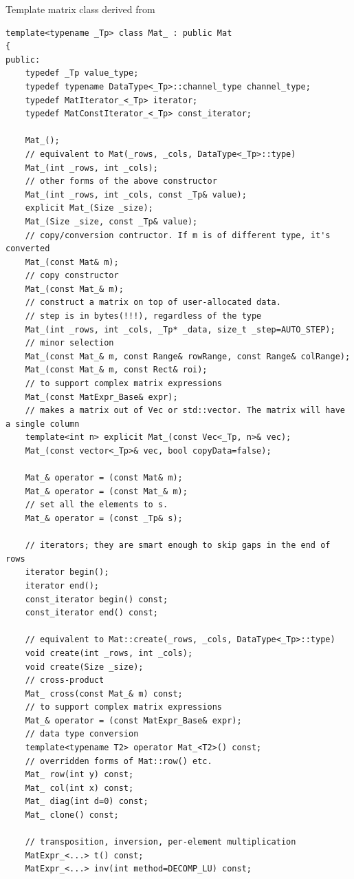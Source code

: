 Template matrix class derived from 

\begin{lstlisting}
template<typename _Tp> class Mat_ : public Mat
{
public:
    typedef _Tp value_type;
    typedef typename DataType<_Tp>::channel_type channel_type;
    typedef MatIterator_<_Tp> iterator;
    typedef MatConstIterator_<_Tp> const_iterator;

    Mat_();
    // equivalent to Mat(_rows, _cols, DataType<_Tp>::type)
    Mat_(int _rows, int _cols);
    // other forms of the above constructor
    Mat_(int _rows, int _cols, const _Tp& value);
    explicit Mat_(Size _size);
    Mat_(Size _size, const _Tp& value);
    // copy/conversion contructor. If m is of different type, it's converted
    Mat_(const Mat& m);
    // copy constructor
    Mat_(const Mat_& m);
    // construct a matrix on top of user-allocated data.
    // step is in bytes(!!!), regardless of the type
    Mat_(int _rows, int _cols, _Tp* _data, size_t _step=AUTO_STEP);
    // minor selection
    Mat_(const Mat_& m, const Range& rowRange, const Range& colRange);
    Mat_(const Mat_& m, const Rect& roi);
    // to support complex matrix expressions
    Mat_(const MatExpr_Base& expr);
    // makes a matrix out of Vec or std::vector. The matrix will have a single column
    template<int n> explicit Mat_(const Vec<_Tp, n>& vec);
    Mat_(const vector<_Tp>& vec, bool copyData=false);

    Mat_& operator = (const Mat& m);
    Mat_& operator = (const Mat_& m);
    // set all the elements to s.
    Mat_& operator = (const _Tp& s);

    // iterators; they are smart enough to skip gaps in the end of rows
    iterator begin();
    iterator end();
    const_iterator begin() const;
    const_iterator end() const;

    // equivalent to Mat::create(_rows, _cols, DataType<_Tp>::type)
    void create(int _rows, int _cols);
    void create(Size _size);
    // cross-product
    Mat_ cross(const Mat_& m) const;
    // to support complex matrix expressions
    Mat_& operator = (const MatExpr_Base& expr);
    // data type conversion
    template<typename T2> operator Mat_<T2>() const;
    // overridden forms of Mat::row() etc.
    Mat_ row(int y) const;
    Mat_ col(int x) const;
    Mat_ diag(int d=0) const;
    Mat_ clone() const;

    // transposition, inversion, per-element multiplication
    MatExpr_<...> t() const;
    MatExpr_<...> inv(int method=DECOMP_LU) const;


\end{lstlisting}
